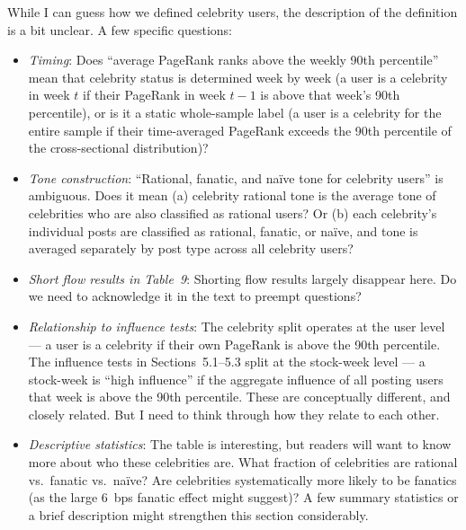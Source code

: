 \documentclass[11pt]{article}
\begin{document}
While I can guess how we defined celebrity users, the description of the definition is a bit unclear. A few specific questions:
\begin{itemize}
  \item \textit{Timing}: Does ``average PageRank ranks above the weekly 90th
    percentile'' mean that celebrity status is determined week by week (a user
    is a celebrity in week $t$ if their PageRank in week $t-1$ is above that
    week's 90th percentile), or is it a static whole-sample label (a user is
    a celebrity for the entire sample if their time-averaged PageRank exceeds
    the 90th percentile of the cross-sectional distribution)?
  \item \textit{Tone construction}: ``Rational, fanatic, and na\"{i}ve tone for
    celebrity users'' is ambiguous. Does it mean (a) celebrity rational tone is
    the average tone of celebrities who are also classified as rational users?
    Or (b) each celebrity's individual posts are classified as rational,
    fanatic, or na\"{i}ve, and tone is averaged separately by post type across
    all celebrity users?

  \item \textit{Short flow results in Table~9}: Shorting flow results largely disappear here. Do we need to acknowledge it in the text to preempt questions? 

  \item \textit{Relationship to influence tests}: The celebrity split operates
    at the user level --- a user is a celebrity if their own PageRank is above
    the 90th percentile. The influence tests in Sections~5.1--5.3 split at the
    stock-week level --- a stock-week is ``high influence'' if the aggregate
    influence of all posting users that week is above the 90th percentile.
    These are conceptually different, and closely related. But I need to think through how they relate to each other.

  \item \textit{Descriptive statistics}: The table is interesting, but readers
    will want to know more about who these celebrities are. What fraction of
    celebrities are rational vs.\ fanatic vs.\ na\"{i}ve? Are celebrities
    systematically more likely to be fanatics (as the large 6~bps fanatic
    effect might suggest)? A few summary statistics or a brief description
    might strengthen this section considerably.
\end{itemize}

\end{document}
